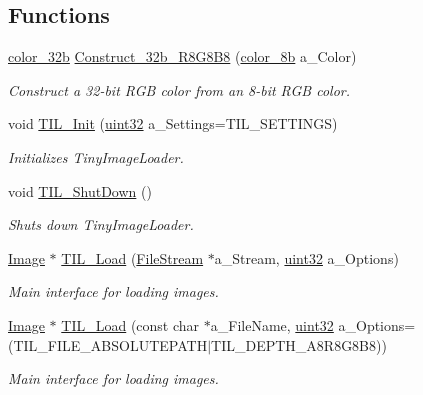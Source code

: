 \subsection*{Functions}
\begin{DoxyCompactItemize}
\item 
\hyperlink{namespacetil_a8eb2d871b8a6ffb55b3eeb720207a6cb}{color\_\-32b} \hyperlink{namespacetil_ab1b5d89f866ea66b4b24c12d971da24a}{Construct\_\-32b\_\-R8G8B8} (\hyperlink{namespacetil_a7f7e0b26e2259ef9f20954c310c78e41}{color\_\-8b} a\_\-Color)
\begin{DoxyCompactList}\small\item\em Construct a 32-\/bit RGB color from an 8-\/bit RGB color. \item\end{DoxyCompactList}\item 
void \hyperlink{namespacetil_a84a20b430c5ae27956968ef6d7a6425b}{TIL\_\-Init} (\hyperlink{namespacetil_a20db61688ed403d11f057a508d87e54c}{uint32} a\_\-Settings=TIL\_\-SETTINGS)
\begin{DoxyCompactList}\small\item\em Initializes TinyImageLoader. \item\end{DoxyCompactList}\item 
void \hyperlink{namespacetil_a777e336727a478c4c4bdfd8c0e3603d7}{TIL\_\-ShutDown} ()
\begin{DoxyCompactList}\small\item\em Shuts down TinyImageLoader. \item\end{DoxyCompactList}\item 
\hyperlink{classtil_1_1_image}{Image} $\ast$ \hyperlink{namespacetil_a8d2e2ab942bb94b188587509ccb754de}{TIL\_\-Load} (\hyperlink{classtil_1_1_file_stream}{FileStream} $\ast$a\_\-Stream, \hyperlink{namespacetil_a20db61688ed403d11f057a508d87e54c}{uint32} a\_\-Options)
\begin{DoxyCompactList}\small\item\em Main interface for loading images. \item\end{DoxyCompactList}\item 
\hyperlink{classtil_1_1_image}{Image} $\ast$ \hyperlink{namespacetil_abd175aec954bbd694f5d76913e49781f}{TIL\_\-Load} (const char $\ast$a\_\-FileName, \hyperlink{namespacetil_a20db61688ed403d11f057a508d87e54c}{uint32} a\_\-Options=(TIL\_\-FILE\_\-ABSOLUTEPATH$|$TIL\_\-DEPTH\_\-A8R8G8B8))
\begin{DoxyCompactList}\small\item\em Main interface for loading images. \item\end{DoxyCompactList}\item 

\end{DoxyCompactItemize}
